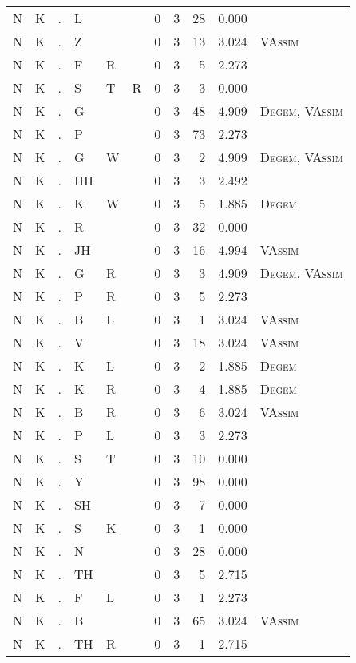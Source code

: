 \begin{longtable}{r@{ } r@{ } c@{ } l@{ } l@{ } l@{ } r r r r l }
N & K & . & L &  &  & 0 & 3 & 28 & 0.000 &  \\
N & K & . & Z &  &  & 0 & 3 & 13 & 3.024 & \textsc{VAssim} \\
N & K & . & F & R &  & 0 & 3 & 5 & 2.273 &  \\
N & K & . & S & T & R & 0 & 3 & 3 & 0.000 &  \\
N & K & . & G &  &  & 0 & 3 & 48 & 4.909 & \textsc{Degem}, \textsc{VAssim} \\
N & K & . & P &  &  & 0 & 3 & 73 & 2.273 &  \\
N & K & . & G & W &  & 0 & 3 & 2 & 4.909 & \textsc{Degem}, \textsc{VAssim} \\
N & K & . & HH &  &  & 0 & 3 & 3 & 2.492 &  \\
N & K & . & K & W &  & 0 & 3 & 5 & 1.885 & \textsc{Degem} \\
N & K & . & R &  &  & 0 & 3 & 32 & 0.000 &  \\
N & K & . & JH &  &  & 0 & 3 & 16 & 4.994 & \textsc{VAssim} \\
N & K & . & G & R &  & 0 & 3 & 3 & 4.909 & \textsc{Degem}, \textsc{VAssim} \\
N & K & . & P & R &  & 0 & 3 & 5 & 2.273 &  \\
N & K & . & B & L &  & 0 & 3 & 1 & 3.024 & \textsc{VAssim} \\
N & K & . & V &  &  & 0 & 3 & 18 & 3.024 & \textsc{VAssim} \\
N & K & . & K & L &  & 0 & 3 & 2 & 1.885 & \textsc{Degem} \\
N & K & . & K & R &  & 0 & 3 & 4 & 1.885 & \textsc{Degem} \\
N & K & . & B & R &  & 0 & 3 & 6 & 3.024 & \textsc{VAssim} \\
N & K & . & P & L &  & 0 & 3 & 3 & 2.273 &  \\
N & K & . & S & T &  & 0 & 3 & 10 & 0.000 &  \\
N & K & . & Y &  &  & 0 & 3 & 98 & 0.000 &  \\
N & K & . & SH &  &  & 0 & 3 & 7 & 0.000 &  \\
N & K & . & S & K &  & 0 & 3 & 1 & 0.000 &  \\
N & K & . & N &  &  & 0 & 3 & 28 & 0.000 &  \\
N & K & . & TH &  &  & 0 & 3 & 5 & 2.715 &  \\
N & K & . & F & L &  & 0 & 3 & 1 & 2.273 &  \\
N & K & . & B &  &  & 0 & 3 & 65 & 3.024 & \textsc{VAssim} \\
N & K & . & TH & R &  & 0 & 3 & 1 & 2.715 &  \\

\end{longtable}
